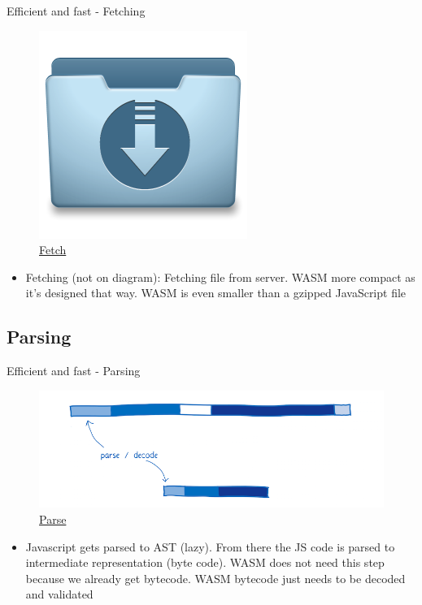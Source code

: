 \documentclass{beamer}
\begin{document}
\begin{frame}{Efficient and fast - Fetching}
    \begin{figure}
        \includegraphics[scale=0.2]{./images/file.jpg}
        \caption{\href{https://icon-library.com/icon/download-icon-file-4.html}{Fetch}}
    \end{figure}
    \begin{itemize}
        \item Fetching (not on diagram): Fetching file from server. WASM more compact as it's designed that way. WASM is even smaller than a gzipped JavaScript file
    \end{itemize}
\end{frame}

\subsection{Parsing}

\begin{frame}{Efficient and fast - Parsing}
    \begin{figure}
        \includegraphics[scale=0.2]{./images/pasedecode.png}
        \caption{\href{https://www.smashingmagazine.com/2017/05/abridged-cartoon-introduction-webassembly/}{Parse}}
    \end{figure}
    \begin{itemize}
        \item Javascript gets parsed to AST (lazy). From there the JS code is parsed to intermediate representation (byte code). WASM does not need this step because we already get bytecode. WASM bytecode just needs to be decoded and validated
    \end{itemize}
\end{frame}
\end{document}
